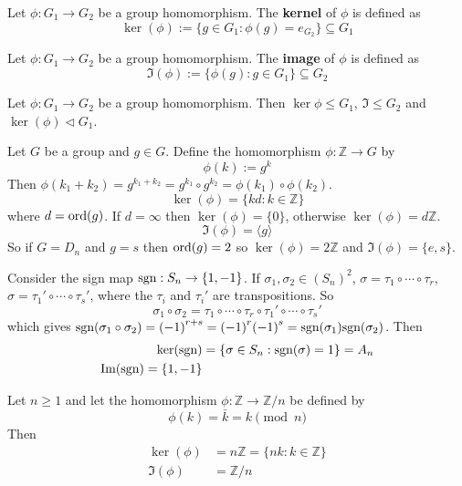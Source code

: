\begin{definition}
	Let $\phi: G_1 \rightarrow G_2$ be a group homomorphism. The \textbf{kernel} of $\phi$ is defined as
	\[
		\ker(\phi) := \{ g \in G_1: \phi(g) = e_{G_2} \} \subseteq G_1
	\]
\end{definition}

\begin{definition}
	Let $\phi: G_1 \rightarrow G_2$ be a group homomorphism. The \textbf{image} of $\phi$ is defined as
	\[
		\Im(\phi) := \{ \phi(g): g \in G_1 \} \subseteq G_2
	\]
\end{definition}

\begin{lemma}
	Let $\phi: G_1 \rightarrow G_2$ be a group homomorphism. Then $\ker{\phi} \le G_1$, $\Im \le G_2$ and $\ker(\phi) \triangleleft G_1$.
\end{lemma}

\begin{example}
	Let $G$ be a group and $g \in G$. Define the homomorphism $\phi: \mathbb{Z} \rightarrow G$ by
	\[
		\phi(k) := g^k
	\]
	Then $\phi(k_1 + k_2) = g^{k_1 + k_2} = g^{k_1} \circ g^{k_2} = \phi(k_1) \circ \phi(k_2)$.
	\[
		\ker(\phi) = \{ k d: k \in \mathbb{Z} \}
	\]
	where $d = \text{ord}(g)$. If $d = \infty$ then $\ker(\phi) = \{ 0 \}$, otherwise $\ker(\phi) = d \mathbb{Z}$.
	\[
		\Im(\phi) = \langle g \rangle
	\]
	So if $G = D_n$ and $g = s$ then $\text{ord}(g) = 2$ so $\ker(\phi) = 2 \mathbb{Z}$ and $\Im(\phi) = \{ e, s \}$.
\end{example}

\begin{example}
	Consider the sign map $\text{sgn}: S_n \rightarrow \{ 1, -1 \}$. If $\sigma_1, \sigma_2 \in {(S_n)}^2$, $\sigma = \tau_1 \circ \cdots \circ \tau_r$, $\sigma = \tau_1' \circ \cdots \circ \tau_s'$, where the $\tau_i$ and $\tau_i'$ are transpositions. So
	\[
		\sigma_1 \circ \sigma_2 = \tau_1 \circ \cdots \circ \tau_r \circ \tau_1' \circ \cdots \circ \tau_s'
	\]
	which gives $\text{sgn}(\sigma_1 \circ \sigma_2) = {(-1)}^{r + s} = {(-1)}^r {(-1)}^s = \text{sgn}(\sigma_1) \text{sgn}(\sigma_2)$.
	Then
	\[
		\begin{aligned}
			\ker(\text{sgn}) & = \{ \sigma \in S_n: \text{sgn}(\sigma) = 1 \} = A_n \\
			\text{Im}(\text{sgn}) = \{ 1, -1 \}
		\end{aligned}
	\]
\end{example}

\begin{example}
	Let $n \ge 1$ and let the homomorphism $\phi: \mathbb{Z} \rightarrow \mathbb{Z} / n$ be defined by
	\[
		\phi(k) = \bar{k} = k \pmod{n}
	\]
	Then
	\[
		\begin{aligned}
			\ker(\phi) & = n \mathbb{Z} = \{ n k: k \in \mathbb{Z} \} \\
			\Im(\phi) & = \mathbb{Z} / n
		\end{aligned}
	\]
\end{example}

